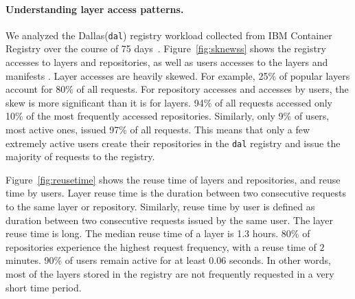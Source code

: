 


\paragraph{Understanding layer access patterns.}
We analyzed the Dallas(\texttt{dal}) registry workload collected from IBM Container Registry over the course of 75 days~\cite{dockerworkload}. 
Figure~\ref{fig:sknewss} shows the registry accesses to layers and repositories, as well as users accesses to the layers and manifests . 
Layer accesses are heavily skewed. For example, 25\% of popular layers account for 80\% of all requests. 
For repository accesses and accesses by users, the skew is more significant than it is for layers. %
94\% of all requests accessed only 10\% of the most frequently accessed repositories. Similarly, only 9\% of users, most active ones, issued 97\% of all requests. 
This means that only a few extremely active users create their repositories in the \texttt{dal} registry and issue the majority of requests to the registry.

Figure~\ref{fig:reusetime} shows the reuse time of layers and repositories, and reuse time by users.
Layer reuse time is the duration between two consecutive requests to the same layer or repository. Similarly,
reuse time by user is defined as duration between two consecutive requests issued by the same user. 
The layer reuse time is long.
The median reuse time of a layer is 1.3 hours. 80\% of repositories experience the highest request frequency, with a reuse time of $2$ minutes. 
90\% of users remain active for at least $0.06$ seconds.
In other words, most of the layers stored in the
registry are not frequently requested in a very short
time period.

